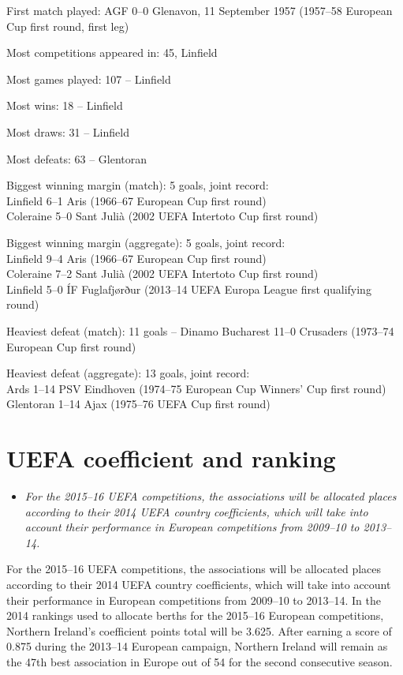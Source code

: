 First match played: AGF 0--0 Glenavon, 11 September 1957 (1957--58
European Cup first round, first leg)

Most competitions appeared in: 45, Linfield

Most games played: 107 -- Linfield

Most wins: 18 -- Linfield

Most draws: 31 -- Linfield

Most defeats: 63 -- Glentoran

Biggest winning margin (match): 5 goals, joint record:\\
Linfield 6--1 Aris (1966--67 European Cup first round)\\
Coleraine 5--0 Sant Julià (2002 UEFA Intertoto Cup first round)

Biggest winning margin (aggregate): 5 goals, joint record:\\
Linfield 9--4 Aris (1966--67 European Cup first round)\\
Coleraine 7--2 Sant Julià (2002 UEFA Intertoto Cup first round)\\
Linfield 5--0 ÍF Fuglafjørður (2013--14 UEFA Europa League first
qualifying round)

Heaviest defeat (match): 11 goals -- Dinamo Bucharest 11--0 Crusaders
(1973--74 European Cup first round)

Heaviest defeat (aggregate): 13 goals, joint record:\\
Ards 1--14 PSV Eindhoven (1974--75 European Cup Winners' Cup first
round)\\
Glentoran 1--14 Ajax (1975--76 UEFA Cup first round)

\section{UEFA coefficient and
ranking}\label{uefa-coefficient-and-ranking}

\begin{itemize}
\item
  \emph{For the 2015--16 UEFA competitions, the associations will be
  allocated places according to their 2014 UEFA country coefficients,
  which will take into account their performance in European
  competitions from 2009--10 to 2013--14.}
\end{itemize}

For the 2015--16 UEFA competitions, the associations will be allocated
places according to their 2014 UEFA country coefficients, which will
take into account their performance in European competitions from
2009--10 to 2013--14. In the 2014 rankings used to allocate berths for
the 2015--16 European competitions, Northern Ireland's coefficient
points total will be 3.625. After earning a score of 0.875 during the
2013--14 European campaign, Northern Ireland will remain as the 47th
best association in Europe out of 54 for the second consecutive season.


